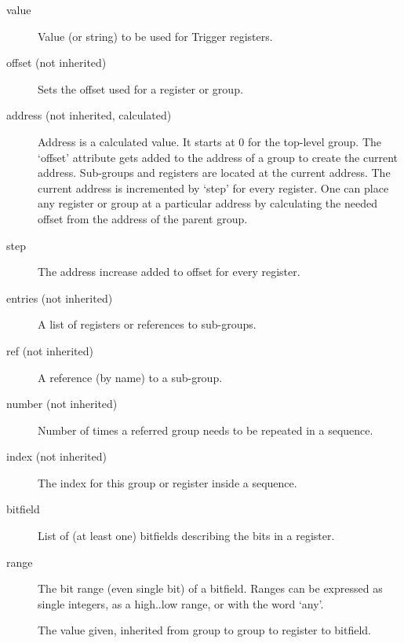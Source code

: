 \documentclass[letterpaper,10pt,english]{sphinxmanual}
\begin{document}
\begin{sphinxVerbatim}[commandchars=\\\{\}]
   
   
   
   
   
   
\end{sphinxVerbatim}
\begin{description}
\item[{value}] \leavevmode
Value (or string) to be used for Trigger registers.

\item[{offset (not inherited)}] \leavevmode
Sets the offset used for a register or group.

\item[{address (not inherited, calculated)}] \leavevmode
Address is a calculated value. It starts at 0 for the top-level group.
The `offset' attribute gets added to the address of a group to create
the current address. Sub-groups and registers are located at the current
address. The current address is incremented by `step' for every register.
One can place any register or group at a particular address by calculating
the needed offset from the address of the parent group.

\item[{step}] \leavevmode
The address increase added to offset for every register.

\item[{entries (not inherited)}] \leavevmode
A list of registers or references to sub-groups.

\item[{ref (not inherited)}] \leavevmode
A reference (by name) to a sub-group.

\item[{number (not inherited)}] \leavevmode
Number of times a referred group needs to be repeated in a sequence.

\item[{index (not inherited)}] \leavevmode
The index for this group or register inside a sequence.

\item[{bitfield}] \leavevmode
List of (at least one) bitfields describing the bits in a register.

\item[{range}] \leavevmode
The bit range (even single bit) of a bitfield. Ranges can be expressed as
single integers, as a high..low range, or with the word `any'.

\item[{}] \leavevmode
The value given, inherited from group to group to register to bitfield.

\end{description}
\end{document}
